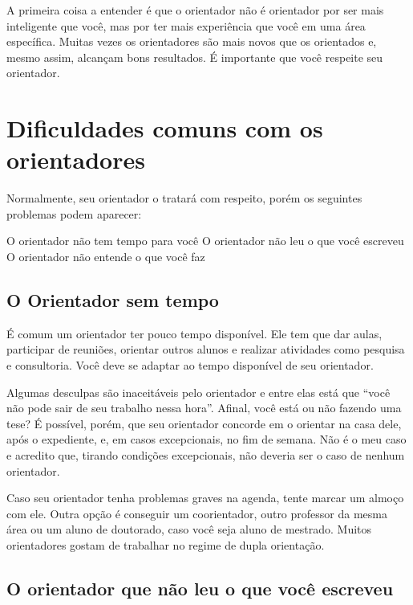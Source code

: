 
A primeira coisa a entender é que o orientador não é orientador por ser mais inteligente que você, mas por ter mais experiência que você em uma área específica.
Muitas vezes os orientadores são mais novos que os orientados e, mesmo assim, alcançam bons resultados. 
É importante que você respeite seu orientador.

\section{Dificuldades comuns com os orientadores}


Normalmente, seu orientador o tratará com respeito, porém os seguintes problemas podem aparecer:

\begin{outline}
\1	O orientador não tem tempo para você
\1	O orientador não leu o que você escreveu
\1	O orientador não entende o que você faz
\end{outline}

\subsection{O Orientador sem tempo}


É comum um orientador ter pouco tempo disponível. Ele tem que dar aulas, participar de reuniões, orientar outros alunos e realizar atividades como pesquisa e consultoria. Você deve se adaptar ao tempo disponível de seu orientador. 


Algumas desculpas são inaceitáveis pelo orientador e entre elas está que ``você não pode sair de seu trabalho nessa hora''. Afinal, você está ou não fazendo uma tese? É possível, porém, que seu orientador concorde em o orientar na casa dele, após o expediente, e, em casos excepcionais, no fim de semana. Não é o meu caso e acredito que, tirando condições excepcionais, não deveria ser o caso de nenhum orientador.

Caso seu orientador tenha problemas graves na agenda, tente marcar um almoço com ele. Outra opção é conseguir um coorientador, outro professor da mesma área ou um aluno de doutorado, caso você seja aluno de mestrado. Muitos orientadores gostam de trabalhar no regime de dupla orientação.


\subsection{O orientador que não leu o que você escreveu}


